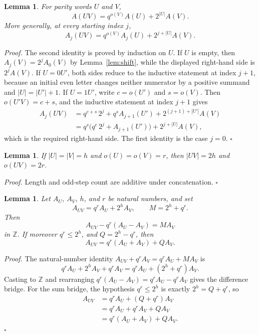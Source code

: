 \documentclass[11pt,letterpaper]{article}
\newcommand{\Z}{\mathbb{Z}}
\newtheorem{lemma}[theorem]{Lemma}
\newenvironment{proof}{\noindent\textit{Proof.}}{\hfill\(\square\)}
\begin{document}
\begin{lemma}
\label{lem:concat}
For parity words \(U\) and \(V\),
\[
A(UV)=q^{o(V)}A(U)+2^{|U|}A(V).
\]
More generally, at every starting index \(j\),
\[
A_j(UV)=q^{o(V)}A_j(U)+2^{j+|U|}A(V).
\]
\end{lemma}

\begin{proof}
The second identity is proved by induction on \(U\). If \(U\) is empty, then \(A_j(V)=2^j A_0(V)\) by Lemma~\ref{lem:shift}, while the displayed right-hand side is \(2^j A(V)\). If \(U=0U'\), both sides reduce to the inductive statement at index \(j+1\), because an initial even letter changes neither numerator by a positive summand and \(|U|=|U'|+1\). If \(U=1U'\), write \(c=o(U')\) and \(s=o(V)\). Then \(o(U'V)=c+s\), and the inductive statement at index \(j+1\) gives
\begin{align*}
A_j(UV)
&=q^{c+s}\,2^j+q^s A_{j+1}(U')+2^{(j+1)+|U'|}A(V)\\
&=q^s\bigl(q^c\,2^j+A_{j+1}(U')\bigr)+2^{j+|U|}A(V),
\end{align*}
which is the required right-hand side. The first identity is the case \(j=0\).
\end{proof}

\begin{lemma}
\label{lem:total}
If \(|U|=|V|=h\) and \(o(U)=o(V)=r\), then \(|UV|=2h\) and \(o(UV)=2r\).
\end{lemma}

\begin{proof}
Length and odd-step count are additive under concatenation.
\end{proof}

\begin{lemma}
\label{lem:bridges}
Let \(A_U\), \(A_V\), \(h\), and \(r\) be natural numbers, and set
\[
A_{UV}=q^r A_U+2^h A_V,\qquad M=2^h+q^r.
\]
Then
\[
A_{UV}-q^r(A_U-A_V)=M A_V
\]
in \(\Z\). If moreover \(q^r\le 2^h\), and \(Q=2^h-q^r\), then
\[
A_{UV}=q^r(A_U+A_V)+Q A_V.
\]
\end{lemma}

\begin{proof}
The natural-number identity \(A_{UV}+q^r A_V=q^r A_U+M A_V\) is
\[
q^r A_U+2^h A_V+q^r A_V=q^r A_U+(2^h+q^r)A_V.
\]
Casting to \(\Z\) and rearranging \(q^r(A_U-A_V)=q^r A_U-q^r A_V\) gives the difference bridge. For the sum bridge, the hypothesis \(q^r\le 2^h\) is exactly \(2^h=Q+q^r\), so
\begin{align*}
A_{UV}
&=q^r A_U+(Q+q^r)A_V \\
&=q^r A_U+q^r A_V+Q A_V \\
&=q^r(A_U+A_V)+Q A_V.
\end{align*}
\end{proof}
\end{document}
